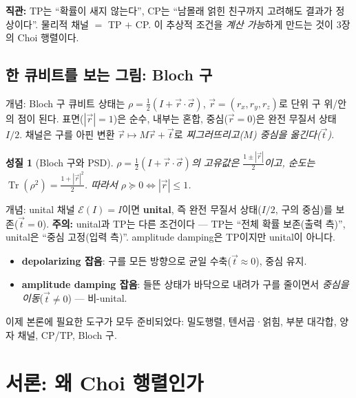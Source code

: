 \documentclass[11pt,a4paper]{article}
\newcommand{\E}{\mathcal{E}}
\newcommand{\Tr}{\operatorname{Tr}}
\theoremstyle{definition}
\theoremstyle{plain}
\newtheorem{property}{성질}[section]
\theoremstyle{remark}
\begin{document}
\begin{intuitionbox}
\textbf{직관:} TP는 ``확률이 새지 않는다'', CP는 ``남몰래 얽힌 친구까지 고려해도 결과가 정상이다''. 물리적 채널 $=$ TP $+$ CP. 이 추상적 조건을 \emph{계산 가능}하게 만드는 것이 3장의 Choi 행렬이다.
\end{intuitionbox}

\subsection{한 큐비트를 보는 그림: Bloch 구}

\begin{conceptbox}{개념: Bloch 구}
큐비트 상태는 $\rho=\tfrac12(I+\vec r\cdot\vec\sigma)$, $\vec r=(r_x,r_y,r_z)$로 단위 구 위/안의 점이 된다. 표면($|\vec r|=1$)은 순수, 내부는 혼합, 중심($\vec r=0$)은 완전 무질서 상태 $I/2$. 채널은 구를 아핀 변환 $\vec r\mapsto M\vec r+\vec t$로 \emph{찌그러뜨리고($M$) 중심을 옮긴다($\vec t$)}.
\end{conceptbox}

\begin{property}[Bloch 구와 PSD]
$\rho=\tfrac12(I+\vec r\cdot\vec\sigma)$의 고유값은 $\tfrac{1\pm|\vec r|}{2}$이고, 순도는 $\Tr(\rho^2)=\tfrac{1+|\vec r|^2}{2}$. 따라서 $\rho\succeq0\iff|\vec r|\le1$.
\end{property}

\begin{conceptbox}{개념: unital 채널}
$\E(I)=I$이면 \textbf{unital}, 즉 완전 무질서 상태($I/2$, 구의 중심)를 보존($\vec t=0$). \textbf{주의:} unital과 TP는 다른 조건이다 --- TP는 ``전체 확률 보존(출력 측)'', unital은 ``중심 고정(입력 측)''. amplitude damping은 TP이지만 unital이 아니다.
\end{conceptbox}

\begin{itemize}
  \item \textbf{depolarizing 잡음}: 구를 모든 방향으로 균일 수축($\vec t\approx0$), 중심 유지.
  \item \textbf{amplitude damping 잡음}: 들뜬 상태가 바닥으로 내려가 구를 줄이면서 \emph{중심을 이동}($\vec t\neq0$) --- 비-unital.
\end{itemize}

이제 본론에 필요한 도구가 모두 준비되었다: 밀도행렬, 텐서곱·얽힘, 부분 대각합, 양자 채널, CP/TP, Bloch 구.

\section{서론: 왜 Choi 행렬인가}
\end{document}
